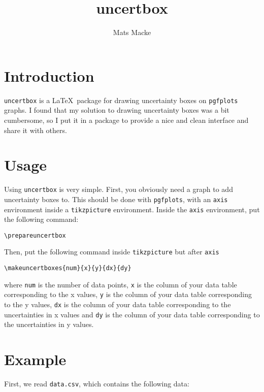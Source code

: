 \documentclass{article}
\begin{document}
\title{uncertbox}    
\author{Mats Macke}
\maketitle

\section{Introduction}
\texttt{uncertbox} is a \LaTeX\ package for drawing uncertainty boxes on \texttt{pgfplots} graphs. I found that my solution to drawing uncertainty boxes was a bit cumbersome, so I put it in a package to provide a nice and clean interface and share it with others.

\section{Usage}
Using \texttt{uncertbox} is very simple. First, you obviously need a graph to add uncertainty boxes to. This should be done with \texttt{pgfplots}, with an \texttt{axis} environment inside a \texttt{tikzpicture} environment. Inside the \texttt{axis} environment, put the following command:

\vspace{10pt}
\verb|\prepareuncertbox|
\vspace{10pt}

\noindent
Then, put the following command inside \texttt{tikzpicture} but after \texttt{axis}

\vspace{10pt}

\verb|\makeuncertboxes{num}{x}{y}{dx}{dy}|

\vspace{10pt}

where \texttt{num} is the number of data points, \texttt{x} is the column of your data table corresponding to the x values, \texttt{y} is the column of your data table corresponding to the y values, \texttt{dx} is the column of your data table corresponding to the uncertainties in x values and \texttt{dy} is the column of your data table corresponding to the uncertainties in y values.

\newpage
\section{Example}
First, we read \texttt{data.csv}, which contains the following data:
\vspace{10pt}
\end{document}
